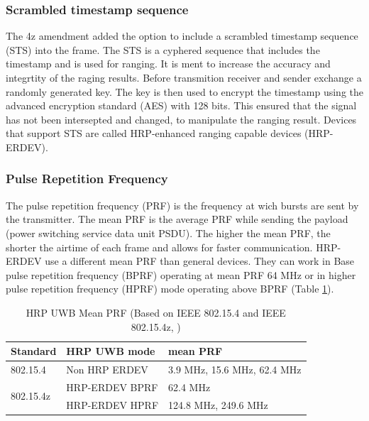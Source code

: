 \subsubsection{Scrambled timestamp sequence}

The 4z amendment added the option to include a scrambled timestamp sequence (STS) into the frame.
The STS is a cyphered sequence that includes the timestamp and is used for ranging.
It is ment to increase the accuracy and integrtity of the raging results.
Before transmition receiver and sender exchange a randomly generated key.
The key is then used to encrypt the timestamp using the advanced encryption standard (AES) with 128 bits.
This ensured that the signal has not been intersepted and changed, to manipulate the ranging result.
Devices that support STS are called HRP-enhanced ranging capable
devices (HRP-ERDEV).

\subsubsection{Pulse Repetition Frequency}
\label{sec:pule repetition frequency}
The pulse repetition frequency (PRF) is the frequency at wich bursts are sent by the transmitter.
The mean PRF is the average PRF while sending the payload (power switching service data unit PSDU). %
The higher the mean PRF, the shorter the airtime of each frame and allows for faster communication.
HRP-ERDEV use a different mean PRF than general devices.
They can work in Base pulse repetition frequency (BPRF) operating at mean PRF 64 MHz or in higher pulse repetition frequency (HPRF) mode operating above BPRF (Table \ref{f:mean PRF}).

\begin{table}[ht!]
\centering
\begin{tabular}{|l|l|l|} 
\hline
\textbf{Standard}          & \textbf{HRP UWB mode} & \textbf{mean PRF}            \\ 
\hline
802.15.4                   & Non HRP ERDEV         & 3.9 MHz, 15.6 MHz, 62.4 MHz  \\ 
\hline
\multirow{2}{*}{802.15.4z} & HRP-ERDEV BPRF        & 62.4 MHz                     \\ 
\cline{2-3}
                           & HRP-ERDEV HPRF        & 124.8 MHz, 249.6 MHz         \\
\hline
\end{tabular}
\caption{HRP UWB Mean PRF (Based on IEEE 802.15.4 and IEEE 802.15.4z, \cite{IEEE4-2020-7, IEEE4z})}
\label{f:mean PRF}
\end{table} %

